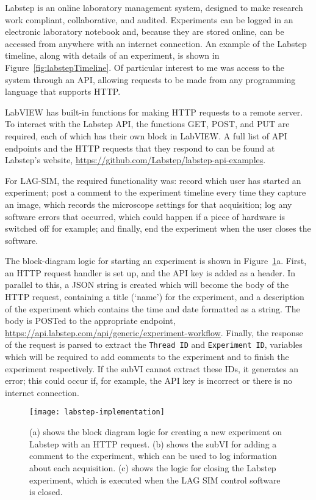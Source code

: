 Labstep is an online laboratory management system, designed to make research work compliant, collaborative, and audited. 
Experiments can be logged in an electronic laboratory notebook and, because they are stored online, can be accessed from anywhere with an internet connection.
An example of the Labstep timeline, along with details of an experiment, is shown in Figure~\ref{fig:labstepTimeline}. 
Of particular interest to me was access to the system through an API, allowing requests to be made from any programming language that supports HTTP. 

LabVIEW has built-in functions for making HTTP requests to a remote server. 
To interact with the Labstep API, the functions GET, POST, and PUT are required, each of which has their own block in LabVIEW. 
A full list of API endpoints and the HTTP requests that they respond to can be found at Labstep's website, \url{https://github.com/Labstep/labstep-api-examples}. 

For LAG-SIM, the required functionality was: record which user has started an experiment; post a comment to the experiment timeline every time they capture an image, which records the microscope settings for that acquisition; log any software errors that occurred, which could happen if a piece of hardware is switched off for example; and finally, end the experiment when the user closes the software. 

The block-diagram logic for starting an experiment is shown in Figure~\ref{fig:labstep-implementation}a. 
First, an HTTP request handler is set up, and the API key is added as a header. 
In parallel to this, a JSON string is created which will become the body of the HTTP request, containing a title (`name') for the experiment, and a description of the experiment which contains the time and date formatted as a string. 
The body is POSTed to the appropriate endpoint, \url{https://api.labstep.com/api/generic/experiment-workflow}. 
Finally, the response of the request is parsed to extract the \texttt{Thread ID} and \texttt{Experiment ID}, variables which will be required to add comments to the experiment and to finish the experiment respectively. 
If the subVI cannot extract these IDs, it generates an error; this could occur if, for example, the API key is incorrect or there is no internet connection. 

\begin{figure}[p]
\centering
\texttt{[image: labstep-implementation]}
\caption[SubVIs for uploading experiment information to Labstep]{(a) shows the block diagram logic for creating a new experiment on Labstep with an HTTP request. (b) shows the subVI for adding a comment to the experiment, which can be used to log information about each acquisition. (c) shows the logic for closing the Labstep experiment, which is executed when the LAG SIM control software is closed. }
\label{fig:labstep-implementation}
\end{figure}

